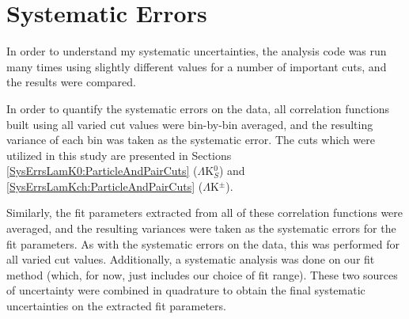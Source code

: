\documentclass[../AnalysisNoteJBuxton.tex]{subfiles}
\begin{document}
\section{Systematic Errors}
\label{SystematicErrors}

In order to understand my systematic uncertainties, the analysis code was run many times using slightly different values for a number of important cuts, and the results were compared.

\begin{comment}

To quantify the effect, the difference in two correlation functions obtained using different values for a given cut was fit with a simple exponential decay function:

\begin{equation}
  \Delta C(k^{*}) = Ae^{-Bk^{*}}
\label{eqn:ExpDecay}
\end{equation}

The amplitude, $A$, and its associated uncertainty for the various cuts can be found in Tables \ref{tab:LamDcaLamK0} through \ref{tab:AvgSepLamKch}.
The systematic effect of the variation is marked as significant (``Sig" column) if the amplitude is not withih 2$\sigma$ of 0.
Although this proves qualitatively useful, these fits will likely not be used to quantify the systematic effects.

\end{comment}

In order to quantify the systematic errors on the data, all correlation functions built using all varied cut values were bin-by-bin averaged, and the resulting variance of each bin was taken as the systematic error.  The cuts which were utilized in this study are presented in Sections \ref{SysErrsLamK0:ParticleAndPairCuts} ($\Lambda$K$^{0}_{S}$) and \ref{SysErrsLamKch:ParticleAndPairCuts} ($\Lambda$K$^{\pm}$).


Similarly, the fit parameters extracted from all of these correlation functions were averaged, and the resulting variances were taken as the systematic errors for the fit parameters.
As with the systematic errors on the data, this was performed for all varied cut values.
Additionally, a systematic analysis was done on our fit method (which, for now, just includes our choice of fit range).
These two sources of uncertainty were combined in quadrature to obtain the final systematic uncertainties on the extracted fit parameters.




\end{document}

